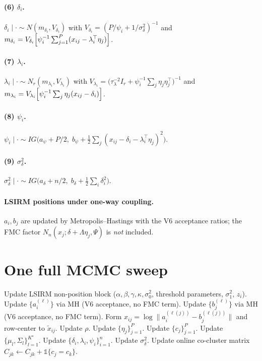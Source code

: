 \documentclass[11pt]{article}
\begin{document}
\paragraph{(6) $\delta_i$.}
$\delta_i\mid\cdot\sim N(m_{\delta_i},V_{\delta_i})$ with
$V_{\delta_i}=(P/\psi_i+1/\sigma_\delta^2)^{-1}$ and
$m_{\delta_i}=V_{\delta_i}\Bigl[\psi_i^{-1}\sum_{j=1}^P(x_{ij}-\lambda_i^\top\eta_j)\Bigr]$.

\paragraph{(7) $\lambda_i$.}
$\lambda_i\mid\cdot\sim N_r(m_{\lambda_i},V_{\lambda_i})$ with
$V_{\lambda_i}=\bigl(\tau_\lambda^{-2}I_r+\psi_i^{-1}\sum_j\eta_j\eta_j^\top\bigr)^{-1}$ and
$m_{\lambda_i}=V_{\lambda_i}\Bigl[\psi_i^{-1}\sum_j\eta_j(x_{ij}-\delta_i)\Bigr]$.

\paragraph{(8) $\psi_i$.}
$\psi_i\mid\cdot\sim IG\bigl(a_\psi+P/2,\;b_\psi+\tfrac12\sum_j(x_{ij}-\delta_i-\lambda_i^\top\eta_j)^2\bigr)$.

\paragraph{(9) $\sigma_\delta^2$.}
$\sigma_\delta^2\mid\cdot\sim IG\bigl(a_\delta+n/2,\;b_\delta+\tfrac12\sum_i\delta_i^2\bigr)$.

\paragraph{LSIRM positions under one-way coupling.}
$a_i,b_j$ are updated by Metropolis--Hastings with the V6 acceptance ratios; the FMC factor $N_n(x_j;\delta+\Lambda\eta_j,\Psi)$ is \emph{not} included.

\section{One full MCMC sweep}

\begin{algorithm}[H]
\caption{One sweep of joint LSIRM~+~FMC (V8, one-way coupling)}
\begin{algorithmic}[1]
\State Update LSIRM non-position block ($\alpha,\beta,\gamma,\kappa,\sigma_0^2$, threshold parameters, $\sigma_1^2$, $z_i$).
\State Update $\{a_i^{(\ell)}\}$ via MH (V6 acceptance, no FMC term).
\State Update $\{b_j^{(\ell)}\}$ via MH (V6 acceptance, no FMC term).
\State Form $x_{ij}=\log\|a_i^{(\ell(j))}-b_j^{(\ell(j))}\|$ and row-center to $\widetilde x_{ij}$.
    \State Update $\rho$.
    \State Update $\{\eta_j\}_{j=1}^P$.
    \State Update $\{c_j\}_{j=1}^P$.
    \State Update $\{\mu_l,\Sigma_l\}_{l=1}^{K^\star}$.
    \State Update $\{\delta_i,\lambda_i,\psi_i\}_{i=1}^n$.
    \State Update $\sigma_\delta^2$.
    \State Update online co-cluster matrix $C_{jk}\leftarrow C_{jk}+\mathbb{1}\{c_j=c_k\}$.
\EndIf
\end{algorithmic}
\end{algorithm}
\end{document}
